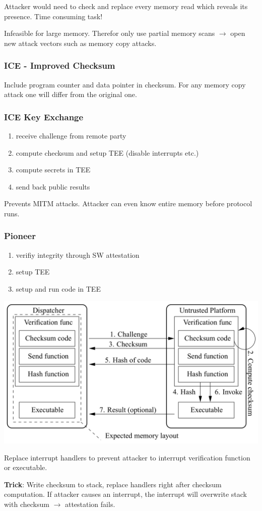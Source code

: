 Attacker would need to check and replace every memory read which reveals its presence. Time consuming task!

Infeasible for large memory. Therefor only use partial memory scans $\xrightarrow{}$ open new attack vectors such as memory copy attacks.

\subsubsection{ICE - Improved Checksum}
Include program counter and data pointer in checksum. For any memory copy attack one will differ from the original one.

\subsubsection{ICE Key Exchange}
\begin{enumerate}
    \item receive challenge from remote party
    \item compute checksum and setup TEE (disable interrupts etc.)
    \item compute secrets in TEE
    \item send back public results
\end{enumerate}

Prevents MITM attacks. Attacker can even know entire memory before protocol runs.

\subsubsection{Pioneer}
\begin{enumerate}
    \item verifiy integrity through SW attestation
    \item setup TEE
    \item setup and run code in TEE
\end{enumerate}
\begin{center}
    \includegraphics[width=0.8\linewidth]{images/software_attestation-pioneer.png}
\end{center}

Replace interrupt handlers to prevent attacker to interrupt verification function or executable.

\textbf{Trick}: Write checksum to stack, replace handlers right after checksum computation. If attacker causes an interrupt, the interrupt will overwrite stack with checksum $\xrightarrow{}$ attestation fails.
